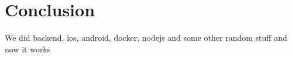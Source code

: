 \chapter{Conclusion}
\label{cha:conclusion}

We did backend, ios, android, docker, nodejs and some other random stuff and now it works
